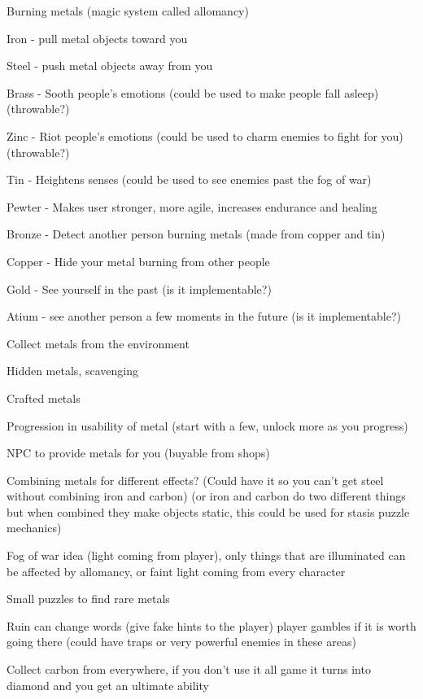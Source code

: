\documentclass{article}
\begin{document}
\begin{description}
\item Burning metals (magic system called allomancy)
\item Iron - pull metal objects toward you
\item Steel - push metal objects away from you
\item Brass - Sooth people's emotions (could be used to make people fall asleep) (throwable?)
\item Zinc - Riot people's emotions (could be used to charm enemies to fight for you) (throwable?)
\item Tin - Heightens senses (could be used to see enemies past the fog of war)
\item Pewter - Makes user stronger, more agile, increases endurance and healing
\item Bronze - Detect another person burning metals (made from copper and tin)
\item Copper - Hide your metal burning from other people
\item Gold - See yourself in the past (is it implementable?)
\item Atium - see another person a few moments in the future (is it implementable?)
\item Collect metals from the environment
\item Hidden metals, scavenging
\item Crafted metals
\item Progression in usability of metal (start with a few, unlock more as you progress)
\item NPC to provide metals for you (buyable from shops)
\item Combining metals for different effects? (Could have it so you can't get steel without combining iron and carbon) (or iron and carbon do two different things but when combined they make objects static, this could be used for stasis puzzle mechanics)
\item Fog of war idea (light coming from player), only things that are illuminated can be affected by allomancy, or faint light coming from every character
\item Small puzzles to find rare metals
\item Ruin can change words (give fake hints to the player) player gambles if it is worth going there (could have traps or very powerful enemies in these areas)
\item Collect carbon from everywhere, if you don't use it all game it turns into diamond and you get an ultimate ability
\end{description}
\end{document}
